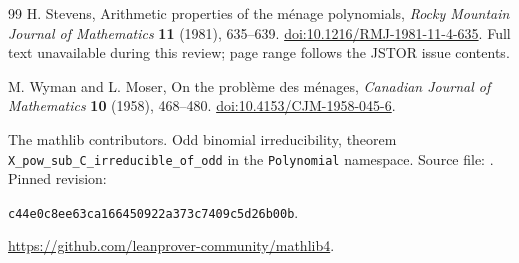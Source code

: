 \documentclass[11pt]{article}
\begin{document}
\begin{thebibliography}{99}
 H. Stevens, Arithmetic properties of the m\'enage
polynomials, \emph{Rocky Mountain Journal of Mathematics} \textbf{11}
(1981), 635--639.
\href{https://doi.org/10.1216/RMJ-1981-11-4-635}{doi:10.1216/RMJ-1981-11-4-635}.
Full text unavailable during this review; page range follows the JSTOR
issue contents.

 M. Wyman and L. Moser, On the probl\`eme des
m\'enages, \emph{Canadian Journal of Mathematics} \textbf{10} (1958),
468--480.
\href{https://doi.org/10.4153/CJM-1958-045-6}{doi:10.4153/CJM-1958-045-6}.

 The mathlib contributors. Odd binomial irreducibility,
theorem \texttt{X\_pow\_sub\_C\_irreducible\_of\_odd} in the
\texttt{Polynomial} namespace. Source file:
. Pinned revision:\par
\texttt{c44e0c8ee63ca166450922a373c7409c5d26b00b}.\par
\url{https://github.com/leanprover-community/mathlib4}.
\end{thebibliography}
\end{document}
